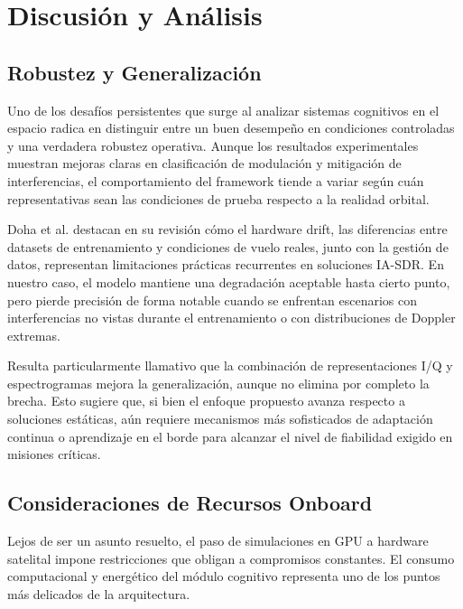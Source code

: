 \section{Discusión y Análisis}

\subsection{Robustez y Generalización}

Uno de los desafíos persistentes que surge al analizar sistemas cognitivos en el espacio radica en distinguir entre un buen desempeño en condiciones controladas y una verdadera robustez operativa. Aunque los resultados experimentales muestran mejoras claras en clasificación de modulación y mitigación de interferencias, el comportamiento del framework tiende a variar según cuán representativas sean las condiciones de prueba respecto a la realidad orbital.

Doha et al. \cite{Doha2026} destacan en su revisión cómo el hardware drift, las diferencias entre datasets de entrenamiento y condiciones de vuelo reales, junto con la gestión de datos, representan limitaciones prácticas recurrentes en soluciones IA-SDR. En nuestro caso, el modelo mantiene una degradación aceptable hasta cierto punto, pero pierde precisión de forma notable cuando se enfrentan escenarios con interferencias no vistas durante el entrenamiento o con distribuciones de Doppler extremas. 

Resulta particularmente llamativo que la combinación de representaciones I/Q y espectrogramas mejora la generalización, aunque no elimina por completo la brecha. Esto sugiere que, si bien el enfoque propuesto avanza respecto a soluciones estáticas, aún requiere mecanismos más sofisticados de adaptación continua o aprendizaje en el borde para alcanzar el nivel de fiabilidad exigido en misiones críticas.

\subsection{Consideraciones de Recursos Onboard}

Lejos de ser un asunto resuelto, el paso de simulaciones en GPU a hardware satelital impone restricciones que obligan a compromisos constantes. El consumo computacional y energético del módulo cognitivo representa uno de los puntos más delicados de la arquitectura.

